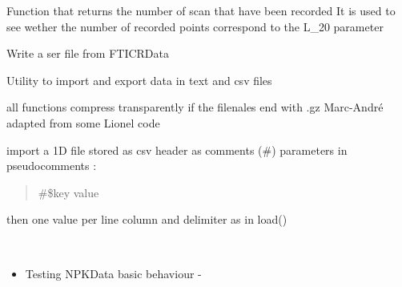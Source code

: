 \documentclass[letterpaper,10pt,openany,oneside]{sphinxmanual}
\begin{document}

\begin{fulllineitems}
\label{rst/code:File.Apex.read_scan}
Function that returns the number of scan that have been recorded
It is used to see wether the number of recorded points correspond to the L\_20 parameter

\end{fulllineitems}


\begin{fulllineitems}
\label{rst/code:File.Apex.write_ser}
Write a ser file from FTICRData

\end{fulllineitems}

\label{rst/code:module-File.csv}
Utility to import and export data in text and csv files

all functions compress transparently if the filenales end with .gz
Marc-André adapted from some Lionel code

\begin{fulllineitems}
\label{rst/code:File.csv.Import_1D}
import a 1D file stored as csv
header as comments (\#)
parameters in pseudocomments :
\begin{quote}

\#\$key value
\end{quote}

then one value per line
column and delimiter  as in load()

\end{fulllineitems}


\begin{fulllineitems}
\label{rst/code:File.csv.NPKDataTests}~\begin{itemize}
\item {} 
Testing NPKData basic behaviour -

\end{itemize}

\end{fulllineitems}
\end{document}
